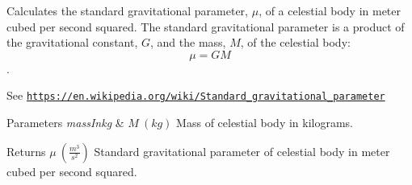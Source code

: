 Calculates the standard gravitational parameter, $\mu$, of a celestial body in meter cubed per second squared. The standard gravitational parameter is a product of the gravitational constant, $G$, and the mass, $M$, of the celestial body\+: \[\mu = GM\]. 

See \href{https://en.wikipedia.org/wiki/Standard_gravitational_parameter}{\tt https\+://en.\+wikipedia.\+org/wiki/\+Standard\+\_\+gravitational\+\_\+parameter}


\begin{DoxyParams}{Parameters}
{\em mass\+Inkg} & $M\ (kg)$ Mass of celestial body in kilograms. \\
\hline
\end{DoxyParams}
\begin{DoxyReturn}{Returns}
$\mu\ (\frac{m^3}{s^2})$ Standard gravitational parameter of celestial body in meter cubed per second squared. 
\end{DoxyReturn}
